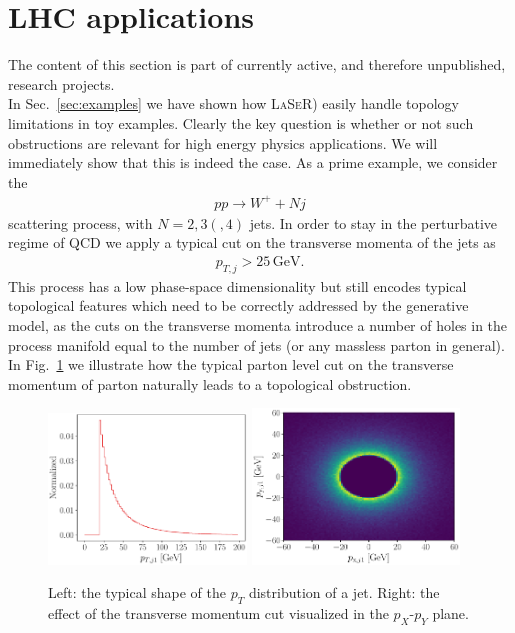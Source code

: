 \section{LHC applications}\label{sec:LHCexamples}
The content of this section is part of currently active, and therefore unpublished, research projects.\\
In Sec.~\ref{sec:examples} we have shown how \textsc{LaSeR}) easily handle topology limitations in toy examples. Clearly the key question is whether or not such obstructions are relevant for high energy physics applications.
We will immediately show that this is indeed the case.
As a prime example, we consider the 
\begin{align}
     p p \to W^+ + Nj
\end{align}
scattering process, with $N = 2, 3 (, 4)$ jets. In order to stay in the perturbative regime of QCD we apply a typical cut on the transverse momenta of the jets as
\begin{align}
    p_{T,j}>25\,\mathrm{GeV}.
\end{align}
This process has a low phase-space dimensionality but still encodes typical topological features which need to be correctly addressed by the generative model, as the cuts on the transverse momenta introduce a number of holes in the process manifold equal to the number of jets (or any massless parton in general). In Fig.~\ref{fig:lhc_hole} we illustrate how the typical parton level cut on the transverse momentum of parton naturally leads to a topological obstruction.
%
\begin{figure}[H]
\centering
\includegraphics[width=0.47\textwidth, page=1]{./figures/pt_ring.pdf}
\includegraphics[width=0.49\textwidth, page=1]{./figures/ring.pdf}
\caption{Left: the typical shape of the $p_T$ distribution of a jet. Right: the effect of the transverse momentum cut visualized in the $p_X$-$p_Y$ plane.}
\label{fig:lhc_hole}
\end{figure}
